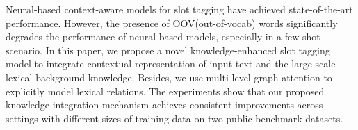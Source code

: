 Neural-based context-aware models for slot tagging have achieved state-of-the-art performance. However, the presence of OOV(out-of-vocab) words significantly degrades the performance of neural-based models, especially in a few-shot scenario. In this paper, we propose a novel knowledge-enhanced slot tagging model to integrate contextual representation of input text and the large-scale lexical background knowledge. Besides, we use multi-level graph attention to explicitly model lexical relations. The experiments show that our proposed knowledge integration mechanism achieves consistent improvements across settings with different sizes of training data on two public benchmark datasets.
